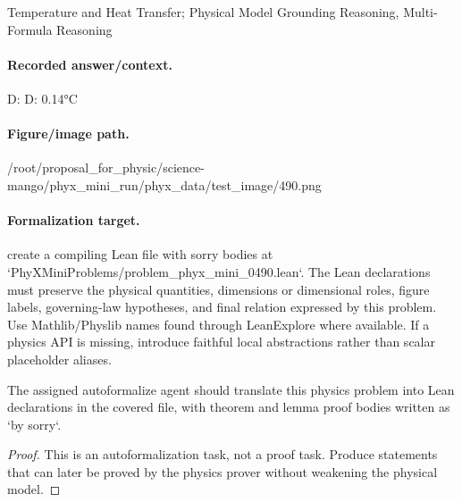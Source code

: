 Temperature and Heat Transfer; Physical Model Grounding Reasoning, Multi-Formula Reasoning

\paragraph{Recorded answer/context.}
D: D: 0.14°C

\paragraph{Figure/image path.}
/root/proposal\_for\_physic/science-mango/phyx\_mini\_run/phyx\_data/test\_image/490.png

\paragraph{Formalization target.}
create a compiling Lean file with sorry bodies at `PhyXMiniProblems/problem\_phyx\_mini\_0490.lean`. The Lean declarations must preserve the physical quantities, dimensions or dimensional roles, figure labels, governing-law hypotheses, and final relation expressed by this problem.
Use Mathlib/Physlib names found through LeanExplore where available. If a physics API is missing, introduce faithful local abstractions rather than scalar placeholder aliases.

\begin{theorem}
\label{thm:physics:phyx_mini_0490:target}
The assigned autoformalize agent should translate this physics problem into Lean declarations in the covered file, with theorem and lemma proof bodies written as `by sorry`.
\end{theorem}
\begin{proof}
This is an autoformalization task, not a proof task. Produce statements that can later be proved by the physics prover without weakening the physical model.
\end{proof}

